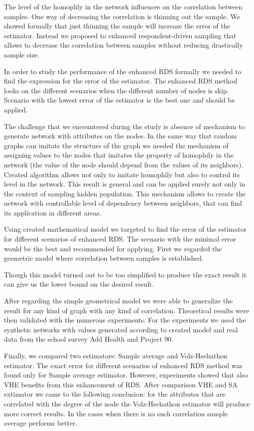 \documentclass[12pt]{report}
\begin{document}
The level of the homoplily in the network influences on the correlation between samples. One way of decreasing the correlation is thinning out the sample. We showed formally that just thinning the sample will increase the error of the estimator. Instead we proposed to enhanced respondent-driven sampling that allows to decrease the correlation between samples without reducing drastically sample size.

In order to study the performance of the enhanced RDS formally we needed to find the expression for the error of the estimator. The enhanced RDS method looks on the different scenarios when the different number of nodes is skip. Scenario with the lowest error of the estimator is the best one and should be applied.

The challenge that we encountered during the study is absence of mechanism to generate network with attributes on the nodes. In the same way that random graphs can imitate the structure of the graph we needed the mechanism of assigning values to the nodes that imitates the property of homophily in the network (the value of the node should depend from the values of its neighbors). Created algorithm allows not only to imitate homophily but also to control its level in the network. This result is general and can be applied surely not only in the context of sampling hidden population. This mechanism allows to create the network with controllable level of dependency between neighbors, that can find its application in different areas.

Using created mathematical model we targeted to find the error of the estimator for different scenarios of enhanced RDS. The scenario with the minimal error would be the best and recommended for applying. First we regarded the geometric model where correlation between samples is established.

Though this model turned out to be too simplified to produce the exact result it can give us the lower bound on the desired result.

After regarding the simple geometrical model we were able to generalize the result for any kind of graph with any kind of correlation. Theoretical results were then validated with the numerous experiments. For the experiments we used the synthetic networks with values generated according to created model and real data from the school survey Add Health and Project 90.

Finally, we compared two estimators: Sample average and Volz-Hechathon estimator. The exact error for different scenarios of enhanced RDS method was found only for Sample average estimator. However, experiments showed that also VHE benefits from this enhancement of RDS. After comparison VHE and SA extimator we came to the following conclusion: for the attributes that are correlated with the degree of the node the Volz-Hechathon estimator will produce more correct results. In the cases when there is no such correlation sample average performs better.




\end{document}
